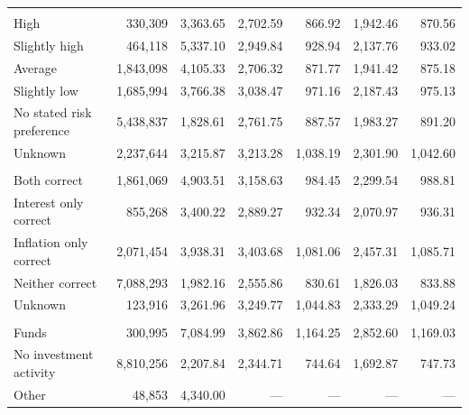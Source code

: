 \documentclass[10pt]{article}
\begin{document}
\begin{center}
\begin{minipage}{\textwidth}
\begin{tabularx}{\textwidth}{@{}Xrrrrrr@{}}
\addlinespace[3pt]
\multicolumn{7}{l}{\textit{Risk preference}} \\

High & 330,309 & 3,363.65 & 2,702.59 & 866.92 & 1,942.46 & 870.56 \\

Slightly high & 464,118 & 5,337.10 & 2,949.84 & 928.94 & 2,137.76 & 933.02 \\

Average & 1,843,098 & 4,105.33 & 2,706.32 & 871.77 & 1,941.42 & 875.18 \\

Slightly low & 1,685,994 & 3,766.38 & 3,038.47 & 971.16 & 2,187.43 & 975.13 \\

No stated risk preference & 5,438,837 & 1,828.61 & 2,761.75 & 887.57 & 1,983.27 & 891.20 \\

Unknown & 2,237,644 & 3,215.87 & 3,213.28 & 1,038.19 & 2,301.90 & 1,042.60 \\

\addlinespace[3pt]
\multicolumn{7}{l}{\textit{Financial literacy}} \\

Both correct & 1,861,069 & 4,903.51 & 3,158.63 & 984.45 & 2,299.54 & 988.81 \\

Interest only correct & 855,268 & 3,400.22 & 2,889.27 & 932.34 & 2,070.97 & 936.31 \\

Inflation only correct & 2,071,454 & 3,938.31 & 3,403.68 & 1,081.06 & 2,457.31 & 1,085.71 \\

Neither correct & 7,088,293 & 1,982.16 & 2,555.86 & 830.61 & 1,826.03 & 833.88 \\

Unknown & 123,916 & 3,261.96 & 3,249.77 & 1,044.83 & 2,333.29 & 1,049.24 \\

\addlinespace[3pt]
\multicolumn{7}{l}{\textit{Investment activity}} \\

Funds & 300,995 & 7,084.99 & 3,862.86 & 1,164.25 & 2,852.60 & 1,169.03 \\

No investment activity & 8,810,256 & 2,207.84 & 2,344.71 & 744.64 & 1,692.87 & 747.73 \\

Other & 48,853 & 4,340.00 & --- & --- & --- & --- \\


\end{tabularx}
\end{minipage}
\end{center}
\end{document}
